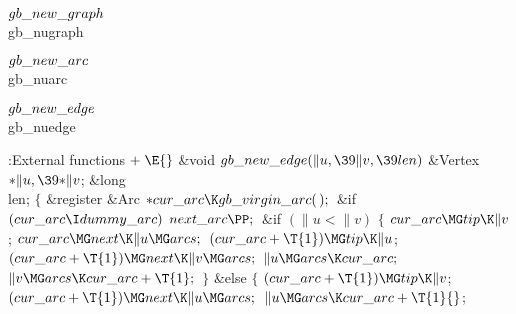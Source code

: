 \Y\B\4\D$\\{gb\_new\_graph}$ \5
\\{gb\_nugraph}\par
\B\4\D$\\{gb\_new\_arc}$ \5
\\{gb\_nuarc}\par
\B\4\D$\\{gb\_new\_edge}$ \5
\\{gb\_nuedge}\par
\Y\B\4:External functions\X${}\mathrel+\E{}$\6
\1\1\&{void} ${}\\{gb\_new\_edge}(\|u,\39\|v,\39\\{len}){}$\6
\&{Vertex} ${}{*}\|u,\39{*}\|v{}$;\6
\&{long} \\{len};\2\2\6
${}\{{}$\5
\1\&{register} \&{Arc} ${}{*}\\{cur\_arc}\K\\{gb\_virgin\_arc}(\,);{}$\7
\&{if} ${}(\\{cur\_arc}\I\\{dummy\_arc}){}$\1\5
${}\\{next\_arc}\PP;{}$\2\6
\&{if} ${}(\|u<\|v){}$\5
${}\{{}$\1\6
${}\\{cur\_arc}\MG\\{tip}\K\|v{}$;\5
${}\\{cur\_arc}\MG\\{next}\K\|u\MG\\{arcs};{}$\6
${}(\\{cur\_arc}+\T{1})\MG\\{tip}\K\|u{}$;\5
${}(\\{cur\_arc}+\T{1})\MG\\{next}\K\|v\MG\\{arcs};{}$\6
${}\|u\MG\\{arcs}\K\\{cur\_arc};{}$\6
${}\|v\MG\\{arcs}\K\\{cur\_arc}+\T{1};{}$\6
\4${}\}{}$\5
\2\&{else}\5
${}\{{}$\1\6
${}(\\{cur\_arc}+\T{1})\MG\\{tip}\K\|v{}$;\5
${}(\\{cur\_arc}+\T{1})\MG\\{next}\K\|u\MG\\{arcs};{}$\6
${}\|u\MG\\{arcs}\K\\{cur\_arc}+\T{1}{}$;\6
